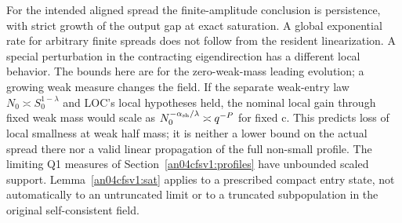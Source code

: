 \documentclass[11pt]{article}
\begin{document}
For the intended aligned spread the finite-amplitude conclusion is
persistence, with strict growth of the output gap at exact saturation.
A global exponential rate for arbitrary finite spreads does not follow
from the resident linearization. A special perturbation in the contracting
eigendirection has a different local behavior. The bounds here are for
the zero-weak-mass leading evolution; a growing weak measure changes
the field. If the separate weak-entry law \(N_0\asymp S_0^{1-\lambda}\)
and LOC's local hypotheses held, the nominal local gain through fixed
weak mass would scale as \(N_0^{-\alpha_{\rm sh}/\lambda}\asymp q^{-P}\)
for fixed c. This predicts loss of local smallness at weak half mass;
it is neither a lower bound on the actual spread there nor a valid
linear propagation of the full non-small profile. The limiting Q1
measures of Section~\ref{an04cfsv1:profiles} have unbounded scaled
support. Lemma~\ref{an04cfsv1:sat} applies to a prescribed compact
entry state, not automatically to an untruncated limit or to a truncated
subpopulation in the original self-consistent field.
\end{document}
